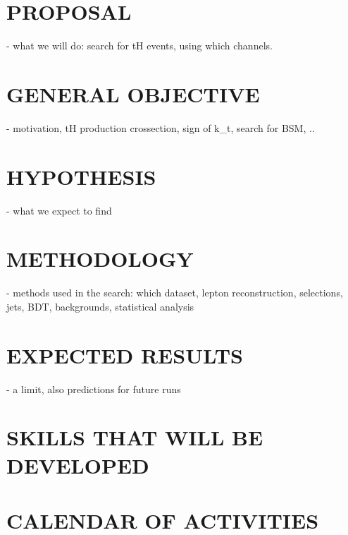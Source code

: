 \documentclass[final,3p]{CSP}
\begin{document}
\section{PROPOSAL}
- what we will do:  search for tH events, using which channels.

\section{GENERAL OBJECTIVE}
- motivation, tH production crossection, sign of k_t, search for BSM, ..


\section{HYPOTHESIS}
- what we expect to find

\section{METHODOLOGY}
- methods used in the search: which dataset,  lepton reconstruction, selections, jets, BDT, backgrounds, statistical analysis

\section{EXPECTED RESULTS}
- a limit, also predictions for future runs


\cleardoublepage



\appendix
\section{SKILLS THAT WILL BE DEVELOPED}

\section{CALENDAR OF ACTIVITIES}
\end{document}
